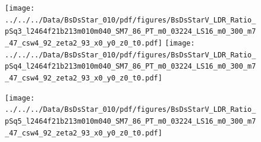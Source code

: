 \documentclass[a4paper,10pt]{article}
\begin{document}
\clearpage
\begin{figure}[p]
 \texttt{[image: ../../../Data/BsDsStar\_010/pdf/figures/BsDsStarV\_LDR\_Ratio\_pSq3\_l2464f21b213m010m040\_SM7\_86\_PT\_m0\_03224\_LS16\_m0\_300\_m7\_47\_csw4\_92\_zeta2\_93\_x0\_y0\_z0\_t0.pdf]} 
 \texttt{[image: ../../../Data/BsDsStar\_010/pdf/figures/BsDsStarV\_LDR\_Ratio\_pSq4\_l2464f21b213m010m040\_SM7\_86\_PT\_m0\_03224\_LS16\_m0\_300\_m7\_47\_csw4\_92\_zeta2\_93\_x0\_y0\_z0\_t0.pdf]} 
 \end{figure}
\begin{figure}[p]
 \texttt{[image: ../../../Data/BsDsStar\_010/pdf/figures/BsDsStarV\_LDR\_Ratio\_pSq5\_l2464f21b213m010m040\_SM7\_86\_PT\_m0\_03224\_LS16\_m0\_300\_m7\_47\_csw4\_92\_zeta2\_93\_x0\_y0\_z0\_t0.pdf]} 
 \end{figure}
\clearpage
\end{document}
